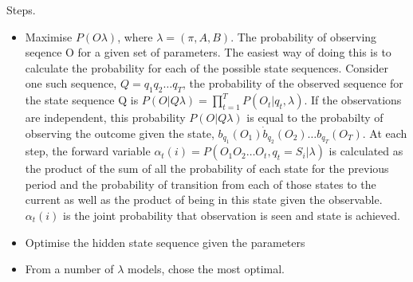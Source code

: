 \documentclass[12pt, a4paper, oneside]{article} %
\begin{document}
Steps. 
\begin{itemize}
\item Maximise $P(O \lambda)$, where $\lambda = (\pi, A, B)$.  The probability of observing seqence O for a given set of parameters.  The easiest way of doing this is to calculate the probability for each of the possible state sequences.  Consider one such sequence, $Q = q_1 q_2 \dots q_T$, the probability of the observed sequence for the state sequence Q is $P(O|Q \lambda) = \prod_{t = 1}^T P(O_t|q_t, \lambda)$.  If the observations are independent, this probability $P(O|Q \lambda)$ is equal to the probabilty of observing the outcome given the state, $b_{q_1}(O_1)\dot b_{q_2} (O_2) \dots b_{q_T}(O_T)$.  At each step, the forward variable $\alpha_t(i) = P(O_1 O_2 \dots O_t, q_t = S_i|\lambda)$ is calculated as the product of the sum of all the probability of each state for the previous period and the probability of transition from each of those states to the current as well as the product of being in this state given the observable. $\alpha_t(i)$ is the joint probability that observation is seen and state is achieved. 
\item Optimise the hidden state sequence given the parameters 
\item From a number of $\lambda$ models, chose the most optimal. 
\end{itemize}






\end{document}
